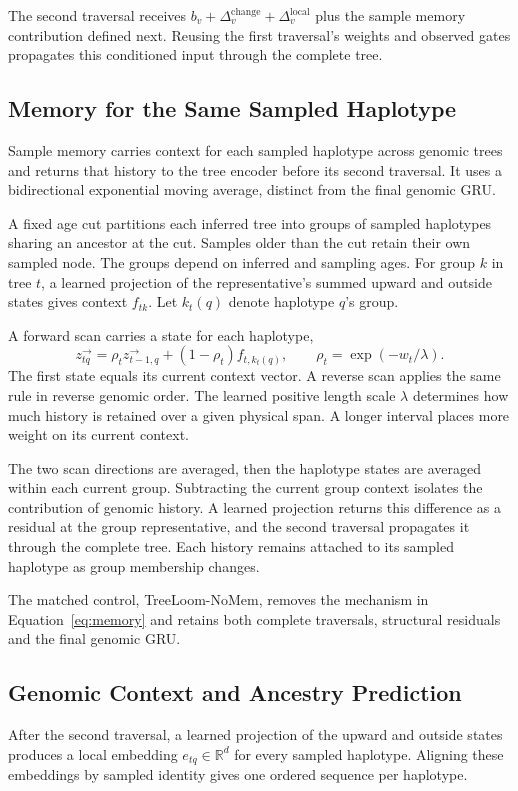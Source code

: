 \documentclass[letterpaper]{article}
\begin{document}
The second traversal receives $b_v+\Delta_v^{\mathrm{change}}+\Delta_v^{\mathrm{local}}$ plus the sample memory contribution defined next. Reusing the first traversal's weights and observed gates propagates this conditioned input through the complete tree.

\subsection{Memory for the Same Sampled Haplotype}
Sample memory carries context for each sampled haplotype across genomic trees and returns that history to the tree encoder before its second traversal. It uses a bidirectional exponential moving average, distinct from the final genomic GRU.

A fixed age cut partitions each inferred tree into groups of sampled haplotypes sharing an ancestor at the cut. Samples older than the cut retain their own sampled node. The groups depend on inferred and sampling ages. For group $k$ in tree $t$, a learned projection of the representative's summed upward and outside states gives context $f_{tk}$. Let $k_t(q)$ denote haplotype $q$'s group.

A forward scan carries a state for each haplotype,
\begin{equation}
z^\rightarrow_{tq}
=\rho_t z^\rightarrow_{t-1,q}
 +(1-\rho_t)f_{t,k_t(q)},
\qquad
\rho_t=\exp(-w_t/\lambda).
\label{eq:memory}
\end{equation}
The first state equals its current context vector. A reverse scan applies the same rule in reverse genomic order. The learned positive length scale $\lambda$ determines how much history is retained over a given physical span. A longer interval places more weight on its current context.

The two scan directions are averaged, then the haplotype states are averaged within each current group. Subtracting the current group context isolates the contribution of genomic history. A learned projection returns this difference as a residual at the group representative, and the second traversal propagates it through the complete tree. Each history remains attached to its sampled haplotype as group membership changes.

The matched control, TreeLoom-NoMem, removes the mechanism in Equation~\ref{eq:memory} and retains both complete traversals, structural residuals and the final genomic GRU.

\subsection{Genomic Context and Ancestry Prediction}
After the second traversal, a learned projection of the upward and outside states produces a local embedding $e_{tq}\in\mathbb{R}^{d}$ for every sampled haplotype. Aligning these embeddings by sampled identity gives one ordered sequence per haplotype.
\end{document}
